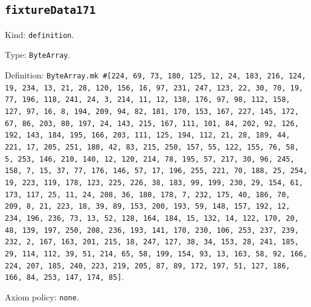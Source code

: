 \documentclass[11pt]{article}
\begin{document}
\subsection*{\texttt{fixtureData171}}
\noindent Kind: \texttt{definition}.\par
\noindent Type: \texttt{ByteArray}.\par
\noindent Definition: \texttt{ByteArray.mk \#[224, 69, 73, 180, 125, 12, 24, 183, 216, 124, 19, 234, 13, 21, 28, 120, 156, 16, 97, 231, 247, 123, 22, 30, 70, 19, 77, 196, 118, 241, 24, 3, 214, 11, 12, 138, 176, 97, 98, 112, 158, 127, 97, 16, 8, 194, 209, 94, 82, 181, 170, 153, 167, 227, 145, 172, 67, 86, 203, 80, 197, 24, 143, 215, 167, 111, 101, 84, 202, 92, 126, 192, 143, 184, 195, 166, 203, 111, 125, 194, 112, 21, 28, 189, 44, 221, 17, 205, 251, 180, 42, 83, 215, 250, 157, 55, 122, 155, 76, 58, 5, 253, 146, 210, 140, 12, 120, 214, 78, 195, 57, 217, 30, 96, 245, 158, 7, 15, 37, 77, 176, 146, 57, 17, 196, 255, 221, 70, 188, 25, 254, 19, 223, 119, 178, 123, 225, 226, 38, 183, 99, 199, 230, 29, 154, 61, 173, 117, 25, 11, 24, 208, 36, 180, 178, 7, 232, 175, 40, 186, 70, 209, 8, 21, 223, 18, 39, 89, 153, 200, 193, 59, 148, 157, 192, 12, 234, 196, 236, 73, 13, 52, 128, 164, 184, 15, 132, 14, 122, 170, 20, 48, 139, 197, 250, 208, 236, 193, 141, 170, 230, 106, 253, 237, 239, 232, 2, 167, 163, 201, 215, 18, 247, 127, 38, 34, 153, 28, 241, 185, 29, 114, 112, 39, 51, 214, 65, 58, 199, 154, 93, 13, 163, 58, 92, 166, 224, 207, 185, 240, 223, 219, 205, 87, 89, 172, 197, 51, 127, 186, 166, 84, 253, 147, 174, 85]}.\par
\noindent Axiom policy: \texttt{none}.\par
\end{document}
